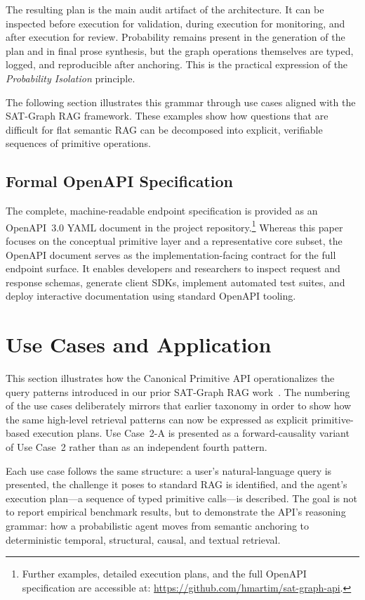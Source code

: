 \documentclass[11pt]{article}
\begin{document}
The resulting plan is the main audit artifact of the architecture. It can be inspected before execution for validation, during execution for monitoring, and after execution for review. Probability remains present in the generation of the plan and in final prose synthesis, but the graph operations themselves are typed, logged, and reproducible after anchoring. This is the practical expression of the \textit{Probability Isolation} principle.

The following section illustrates this grammar through use cases aligned with the SAT-Graph RAG framework. These examples show how questions that are difficult for flat semantic RAG can be decomposed into explicit, verifiable sequences of primitive operations.

\subsection{Formal OpenAPI Specification}
\label{subsec:openapi}

The complete, machine-readable endpoint specification is provided as an OpenAPI~3.0 YAML document in the project repository.\footnote{Further examples, detailed execution plans, and the full OpenAPI specification are accessible at: \url{https://github.com/hmartim/sat-graph-api}.} Whereas this paper focuses on the conceptual primitive layer and a representative core subset, the OpenAPI document serves as the implementation-facing contract for the full endpoint surface. It enables developers and researchers to inspect request and response schemas, generate client SDKs, implement automated test suites, and deploy interactive documentation using standard OpenAPI tooling.

\section{Use Cases and Application}
\label{sec:use_cases}

This section illustrates how the Canonical Primitive API operationalizes the query patterns introduced in our prior SAT-Graph RAG work~\cite{demartim2025graphrag}. The numbering of the use cases deliberately mirrors that earlier taxonomy in order to show how the same high-level retrieval patterns can now be expressed as explicit primitive-based execution plans. Use Case~2-A is presented as a forward-causality variant of Use Case~2 rather than as an independent fourth pattern.

Each use case follows the same structure: a user's natural-language query is presented, the challenge it poses to standard RAG is identified, and the agent's execution plan---a sequence of typed primitive calls---is described. The goal is not to report empirical benchmark results, but to demonstrate the API's reasoning grammar: how a probabilistic agent moves from semantic anchoring to deterministic temporal, structural, causal, and textual retrieval.
\end{document}
